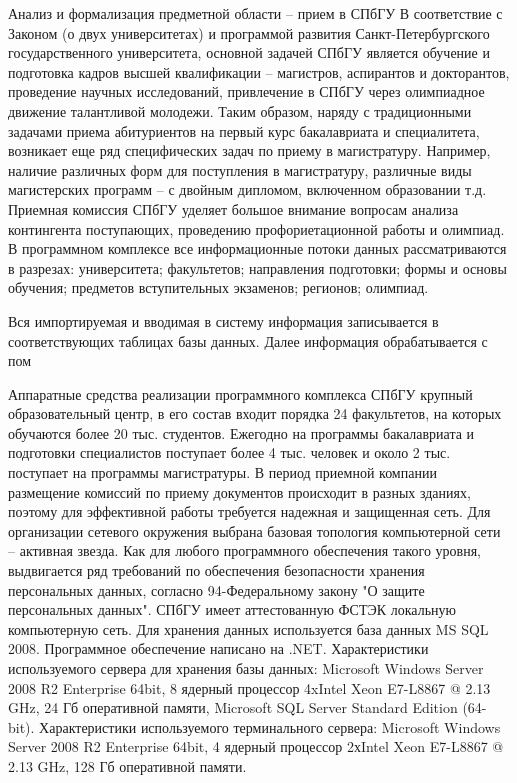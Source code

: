 \documentclass[12pt]{article}
\begin{document}
Анализ и формализация предметной области  -- прием в СПбГУ
В соответствие с Законом (о двух университетах) и программой развития Санкт-Петербургского государственного университета, основной задачей СПбГУ является обучение и подготовка кадров высшей квалификации – магистров, аспирантов и докторантов, проведение научных исследований, привлечение в СПбГУ через олимпиадное движение талантливой молодежи. Таким образом, наряду с традиционными задачами приема абитуриентов на первый курс бакалавриата и специалитета, возникает еще ряд специфических задач по приему в магистратуру. Например, наличие различных форм для поступления в магистратуру, различные виды магистерских программ – с двойным дипломом, включенном образовании т.д. Приемная комиссия СПбГУ уделяет большое внимание вопросам анализа контингента поступающих, проведению профориетационной работы и олимпиад. В программном комплексе все информационные потоки данных рассматриваются в разрезах: 
университета;
факультетов;
направления подготовки;
формы и основы обучения;
предметов вступительных экзаменов;
регионов;
олимпиад.

Вся импортируемая и вводимая в систему информация записывается в соответствующих таблицах базы данных. Далее информация обрабатывается с пом

Аппаратные средства реализации программного комплекса
          СПбГУ крупный образовательный центр, в его состав входит порядка 24 факультетов, на которых обучаются более 20 тыс. студентов. Ежегодно на программы бакалавриата и подготовки специалистов поступает более 4 тыс. человек и около 2 тыс. поступает на программы магистратуры. В период приемной компании размещение комиссий по приему документов происходит в разных зданиях, поэтому для эффективной работы требуется надежная и защищенная сеть. Для организации сетевого окружения выбрана базовая топология компьютерной сети – активная звезда. Как для любого программного обеспечения такого уровня, выдвигается ряд требований по обеспечения безопасности хранения персональных данных, согласно 94-Федеральному закону "О защите персональных данных". СПбГУ имеет аттестованную ФСТЭК локальную компьютерную сеть. Для хранения данных используется база данных MS SQL 2008. Программное обеспечение написано на .NET.
Характеристики используемого сервера для хранения базы данных: Microsoft Windows Server 2008 R2 Enterprise 64bit, 8 ядерный процессор 4xIntel Xeon E7-L8867 @ 2.13 GHz, 24 Гб оперативной памяти, Microsoft SQL Server Standard Edition (64-bit).
Характеристики используемого терминального сервера: Microsoft Windows Server 2008 R2 Enterprise 64bit, 4 ядерный процессор 2хIntel Xeon E7-L8867 @ 2.13 GHz, 128 Гб оперативной памяти.
\end{document}
